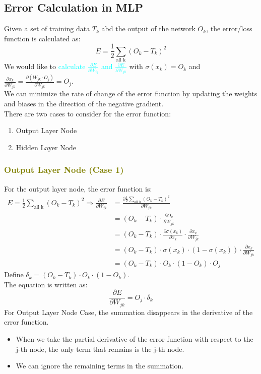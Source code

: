 \documentclass{book}
\begin{document}
\subsection{Error Calculation in MLP}
Given a set of training data \(T_k\) abd the output of the network \(O_k\), the error/loss function is calculated as:
\[
    E = \frac{1}{2} \sum_{\text{all k}} (O_k - T_k)^2
\]
We would like to \textcolor{cyan}{calculate \(\frac{\partial E}{\partial W_{ij}}\) and \(\frac{\partial E}{\partial W_{jk}}\)} with \(\sigma(x_k) = O_k\) and \(\frac{\partial x_k}{\partial W_{jk}} = \frac{\partial (W_{jk} \cdot O_j)}{\partial W_{jk}} = O_j\).\\
We can minimize the rate of change of the error function by updating the weights and biases in the direction of the negative gradient.\\
There are two cases to consider for the error function:
\begin{enumerate}
    \item Output Layer Node
    \item Hidden Layer Node
\end{enumerate}
\textcolor{olive}{\subsubsection{Output Layer Node (Case 1)}}
For the output layer node, the error function is:
\begin{align*}
    E = \frac{1}{2} \sum_{\text{all k}} (O_k - T_k)^2 \Rightarrow \frac{\partial E}{\partial W_{jk}} &= \frac{\partial \frac{1}{2} \sum_{\text{all k}} (O_k - T_k)^2}{\partial W_{jk}}\\
    &= (O_k - T_k) \cdot \frac{\partial O_k}{\partial W_{jk}}\\
    &= (O_k - T_k) \cdot \frac{\partial \sigma(x_k)}{\partial x_k} \cdot \frac{\partial x_k}{\partial W_{jk}}\\
    &= (O_k - T_k) \cdot \sigma(x_k) \cdot (1 - \sigma(x_k)) \cdot \frac{\partial x_k}{\partial W_{jk}}\\
    &= (O_k - T_k) \cdot O_k \cdot (1 - O_k) \cdot O_j
\end{align*}
Define \(\delta_k = (O_k - T_k) \cdot O_k \cdot (1 - O_k)\).\\ The equation is written as:
\[
    \frac{\partial E}{\partial W_{jk}} = O_j \cdot \delta_k
\]
For Output Layer Node Case, the summation disappears in the derivative of the error function.
\begin{itemize}
    \item When we take the partial derivative of the error function with respect to the j-th node, the only term that remains is the j-th node.
    \item We can ignore the remaining terms in the summation.
\end{itemize}
\end{document}
